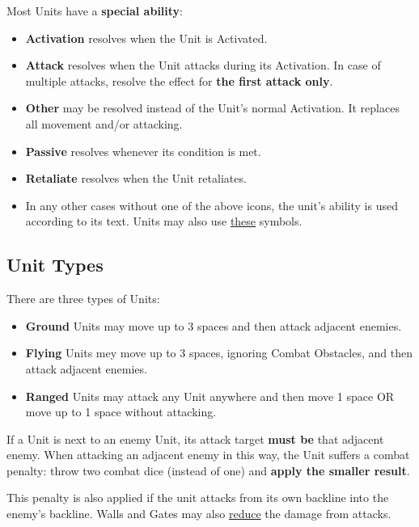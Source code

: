 \begin{multicols}{2}
Most Units have a \textbf{special ability}:\par
\begin{itemize}[wide]
  \item\textbf{Activation}  resolves when the Unit is Activated.
  \item\textbf{Attack}  resolves when the Unit attacks during its Activation.
    In case of multiple attacks, resolve the effect for \textbf{the first attack only}.
  \item\textbf{Other}  may be resolved instead of the Unit's normal Activation.
    It replaces all movement and/or attacking.
  \item\textbf{Passive}  resolves whenever its condition is met.
  \item\textbf{Retaliate}  resolves when the Unit retaliates.
  \item In any other cases without one of the above icons, the unit's ability is used according to its text.
    Units may also use \hyperlink{Playerdecks}{these} symbols.
\end{itemize}

\vspace*{\fill}

\columnbreak

\subsection*{\hypertarget{Unittype}{Unit Types}}
There are three types of Units:
\begin{itemize}
  \item \textbf{Ground}  Units may move up to 3 spaces and then attack adjacent enemies.
  \item \textbf{Flying}  Units mey move up to 3 spaces, ignoring Combat Obstacles, and then attack adjacent enemies.
  \item \textbf{Ranged}  Units may attack any Unit anywhere and then move 1 space OR move up to 1 space without attacking.
\end{itemize}
If a  Unit is next to an enemy Unit, its attack target \textbf{must be} that adjacent enemy.
When attacking an adjacent enemy in this way, the  Unit suffers a combat penalty: throw two combat dice (instead of one) and \textbf{apply the smaller result}.\par
This penalty is also applied if the  unit attacks from its own backline into the enemy's backline.
Walls and Gates may also \hyperlink{Walls}{reduce} the damage from   attacks.


\end{multicols}
